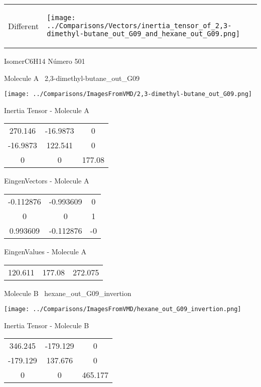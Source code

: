 \vtab[-5mm]
\begin{tabular}{*{2}{m{}}}
\begin{center}
\textcolor{NavyBlue}{\Large Different}
\end{center}
&
\begin{center}
\texttt{[image: ../Comparisons/Vectors/inertia\_tensor\_of\_2,3-dimethyl-butane\_out\_G09\_and\_hexane\_out\_G09.png]}
\end{center}
\end{tabular}

 \newpage

\vtab[-3cm]
\begin{center}
{\large IsomerC6H14 \tab Número 501}
\end{center}
\begin{multicols}{2}
\begin{center}

Molecule A \
2,3-dimethyl-butane\_out\_G09

\texttt{[image: ../Comparisons/ImagesFromVMD/2,3-dimethyl-butane\_out\_G09.png]}

Inertia Tensor - Molecule A \\
\begin{tabular}{|c c c|}
270.146	 & 	-16.9873	 & 	0	 \\
-16.9873	 & 	122.541	 & 	0	 \\
0	 & 	0	 & 	177.08
\end{tabular}

\vtab
 EingenVectors - Molecule A     \\
\begin{tabular}{|c c c|}
-0.112876	 & 	-0.993609	 & 	0	 \\
0	 & 	0	 & 	1	 \\
0.993609	 & 	-0.112876	 & 	-0
\end{tabular}

\vtab
 EingenValues - Molecule A     \\
\begin{tabular}{|c c c|}
120.611	 & 	177.08	 & 	272.075	 \\
\end{tabular}
\columnbreak

Molecule B \
hexane\_out\_G09\_invertion

\texttt{[image: ../Comparisons/ImagesFromVMD/hexane\_out\_G09\_invertion.png]}

Inertia Tensor - Molecule B \\
\begin{tabular}{|c c c|}
346.245	 & 	-179.129	 & 	0	 \\
-179.129	 & 	137.676	 & 	0	 \\
0	 & 	0	 & 	465.177
\end{tabular}


\end{center}
\end{multicols}
